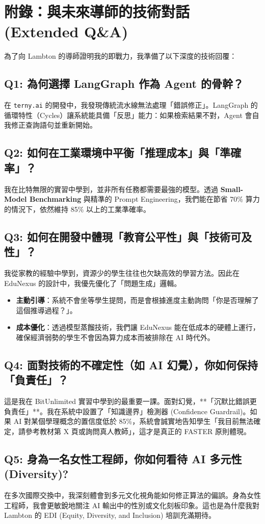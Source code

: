 \documentclass[12pt,a4paper]{article}
\begin{document}
\newpage

\section*{附錄：與未來導師的技術對話 (Extended Q\&A)}

為了向 Lambton 的導師證明我的即戰力，我準備了以下深度的技術回覆：

\subsection*{Q1: 為何選擇 LangGraph 作為 Agent 的骨幹？}
在 \texttt{terny.ai} 的開發中，我發現傳統流水線無法處理「錯誤修正」。LangGraph 的循環特性（Cycles）讓系統能具備「反思」能力：如果檢索結果不對，Agent 會自我修正查詢語句並重新開始。

\subsection*{Q2: 如何在工業環境中平衡「推理成本」與「準確率」？}
我在比特無限的實習中學到，並非所有任務都需要最強的模型。透過 \textbf{Small-Model Benchmarking} 與精準的 Prompt Engineering，我們能在節省 70\% 算力的情況下，依然維持 85\% 以上的工業準確率。

\subsection*{Q3: 如何在開發中體現「教育公平性」與「技術可及性」？}
我從家教的經驗中學到，資源少的學生往往也欠缺高效的學習方法。因此在 EduNexus 的設計中，我優先優化了「問題生成」邏輯。
\begin{itemize}
    \item \textbf{主動引導}：系統不會坐等學生提問，而是會根據進度主動詢問「你是否理解了這個推導過程？」。
    \item \textbf{成本優化}：透過模型蒸餾技術，我們讓 EduNexus 能在低成本的硬體上運行，確保經濟弱勢的學生不會因為算力成本而被排除在 AI 時代外。
\end{itemize}

\subsection*{Q4: 面對技術的不確定性（如 AI 幻覺），你如何保持「負責任」？}
這是我在 BitUnlimited 實習中學到的最重要一課。面對幻覺，**「沉默比錯誤更負責任」**。我在系統中設置了「知識邊界」檢測器 (Confidence Guardrail)。如果 AI 對某個學理概念的置信度低於 85\%，系統會誠實地告知學生「我目前無法確定，請參考教材第 X 頁或詢問真人教師」，這才是真正的 FASTER 原則體現。

\subsection*{Q5: 身為一名女性工程師，你如何看待 AI 多元性 (Diversity)?}
在多次國際交換中，我深刻體會到多元文化視角能如何修正算法的偏誤。身為女性工程師，我會更敏銳地關注 AI 輸出中的性別或文化刻板印象。這也是為什麼我對 Lambton 的 EDI (Equity, Diversity, and Inclusion) 培訓充滿期待。
\end{document}
